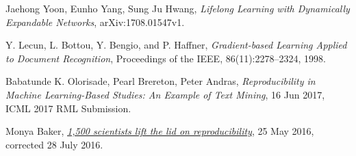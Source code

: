 \documentclass[12pt]{article}
\begin{document}
    \begin{thebibliography}{9}
            Jaehong Yoon, Eunho Yang, Sung Ju Hwang,
            \textit{Lifelong Learning with Dynamically Expandable Networks},
            arXiv:1708.01547v1.

            Y. Lecun, L. Bottou, Y. Bengio, and P. Haffner,
            \textit{Gradient-based Learning Applied to Document Recognition},
            Proceedings of the IEEE, 86(11):2278–2324, 1998.

            Babatunde K. Olorisade, Pearl Brereton, Peter Andras, 
            \textit{Reproducibility in Machine Learning-Based Studies: An Example of Text Mining},
            16 Jun 2017, ICML 2017 RML Submission.

            Monya Baker,
            \href{https://www.nature.com/news/1-500-scientists-lift-the-lid-on-reproducibility-1.19970}{\textit{1,500 scientists lift the lid on reproducibility}},
            25 May 2016, corrected 28 July 2016.

    \end{thebibliography}
    
    
\end{document}
